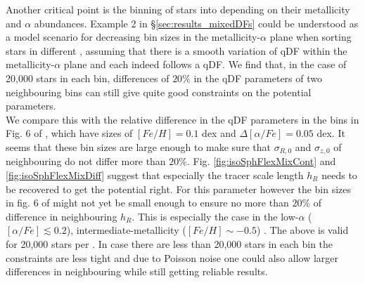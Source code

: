  Another critical point is the binning of stars into \MAPs depending on their metallicity and $\alpha$ abundances. Example 2 in \S\ref{sec:results_mixedDFs} could be understood as a model scenario for decreasing bin sizes in the metallicity-$\alpha$ plane when sorting stars in different \MAPs, assuming that there is a smooth variation of qDF within the metallicity-$\alpha$ plane and each \MAP indeed follows a qDF. We find that, in the case of 20,000 stars in each bin, differences of $20\%$ in the qDF parameters of two neighbouring bins can still give quite good constraints on the potential parameters. 
\\We compare this with the relative difference in the qDF parameters in the bins in Fig. 6 of \cite{bov13}, which have sizes of $[Fe/H] = 0.1$ dex and $\Delta [\alpha/Fe] = 0.05$ dex. It seems that these bin sizes are large enough to make sure that $\sigma_{R,0}$ and $\sigma_{z,0}$ of neighbouring \MAPs do not differ more than $20\%$. Fig. \ref{fig:isoSphFlexMixCont} and \ref{fig:isoSphFlexMixDiff} suggest that especially the tracer scale length $h_R$ needs to be recovered to get the potential right. For this parameter however the bin sizes in fig. 6 of \cite{bov13} might not yet be small enough to ensure no more than $20\%$ of difference in neighbouring $h_R$. This is especially the case in the low-$\alpha$ ($[\alpha/Fe] \lesssim 0.2$), intermediate-metallicity ($[Fe/H] \sim -0.5$) \MAPs. The above is valid for 20,000 stars per \MAP. In case there are less than 20,000 stars in each bin the constraints are less tight and due to Poisson noise one could also allow larger differences in neighbouring \MAPs while still getting reliable results.

